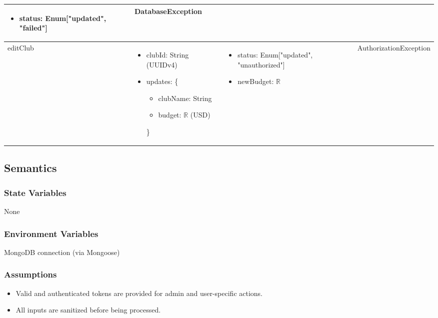 \documentclass[12pt, titlepage]{article}
\begin{document}
\begin{center}
\begin{tabular}{p{2cm} p{4cm} p{2cm} p{4cm}}
\begin{minipage}{3.5cm}
  \begin{itemize}[leftmargin=*,noitemsep]
    \item status: Enum["updated", "failed"]
  \end{itemize}
  \end{minipage} & 
  DatabaseException \\
  \hline
  editClub & 
  \begin{minipage}{3.5cm}
  \vspace{-0.2cm}
  \begin{itemize}[leftmargin=*,noitemsep]
    \item clubId: String (UUIDv4)
    \item updates: \{
      \begin{itemize}[leftmargin=*,noitemsep]
        \item clubName: String
        \item budget: $\mathbb{R}$ (USD)
      \end{itemize}\}
  \end{itemize}
  \end{minipage} & 
  \begin{minipage}{3.5cm}
  \vspace{-0.2cm}
  \begin{itemize}[leftmargin=*,noitemsep]
    \item status: Enum["updated", "unauthorized"]
    \item newBudget: $\mathbb{R}$
  \end{itemize}
  \end{minipage} & 
  AuthorizationException \\
  \hline
  \end{tabular}
  \end{center}

\subsection{Semantics}

\subsubsection{State Variables}
None

\subsubsection{Environment Variables}
MongoDB connection (via Mongoose)

\subsubsection{Assumptions}
\begin{itemize}
  \item Valid and authenticated tokens are provided for admin and user-specific actions.
  \item All inputs are sanitized before being processed.
\end{itemize}
\end{document}

